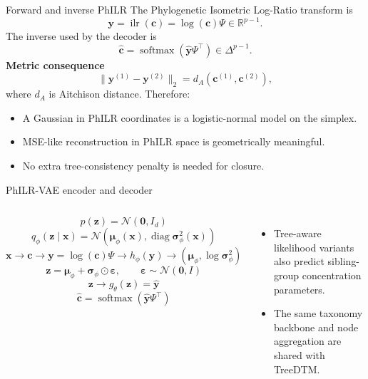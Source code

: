 \documentclass[aspectratio=169,10pt]{beamer}
\newcommand{\R}{\mathbb R}
\newcommand{\softmax}{\operatorname{softmax}}
\newcommand{\diag}{\operatorname{diag}}
\begin{document}
\begin{frame}{Forward and inverse PhILR}
\small
The Phylogenetic Isometric Log-Ratio transform is
\[
\bm y=\operatorname{ilr}(\bm c)=\log(\bm c)\Psi\in\R^{p-1}.
\]
The inverse used by the decoder is
\[
\widehat{\bm c}=\softmax(\widehat{\bm y}\Psi^\top)\in\Delta^{p-1}.
\]
\textbf{Metric consequence}
\[
\|\bm y^{(1)}-\bm y^{(2)}\|_2
=d_A(\bm c^{(1)},\bm c^{(2)}),
\]
where \(d_A\) is Aitchison distance. Therefore:
\begin{itemize}
  \item A Gaussian in PhILR coordinates is a logistic-normal model on the simplex.
  \item MSE-like reconstruction in PhILR space is geometrically meaningful.
  \item No extra tree-consistency penalty is needed for closure.
\end{itemize}
\end{frame}

\begin{frame}{PhILR-VAE encoder and decoder}
\small
\begin{columns}[T,onlytextwidth]
\[
p(\bm z)=\mathcal N(\bm0,I_d)
\]
\[
q_\phi(\bm z\mid \bm x)
=\mathcal N\!\left(\bm\mu_\phi(\bm x),
\diag \bm\sigma_\phi^2(\bm x)\right)
\]
\[
\bm x\to\bm c\to\bm y=\log(\bm c)\Psi
\to h_\phi(\bm y)\to(\bm\mu_\phi,\log\bm\sigma_\phi^2)
\]
\[
\bm z=\bm\mu_\phi+\bm\sigma_\phi\odot\bm\varepsilon,\qquad
\bm\varepsilon\sim\mathcal N(\bm0,I)
\]
\[
\bm z\to g_\theta(\bm z)=\widehat{\bm y}
\]
\[
\widehat{\bm c}=\softmax(\widehat{\bm y}\Psi^\top)
\]
\begin{itemize}
  \item Tree-aware likelihood variants also predict sibling-group concentration parameters.
  \item The same taxonomy backbone and node aggregation are shared with TreeDTM.
\end{itemize}
\end{columns}
\end{frame}
\end{document}
